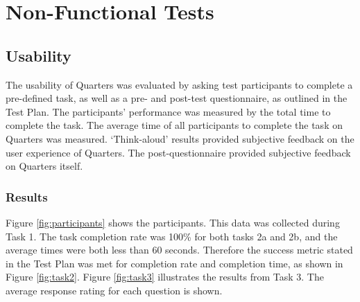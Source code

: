 \documentclass[12pt]{article}
\begin{document}
\section{Non-Functional Tests}

\subsection{Usability}
The usability of Quarters was evaluated by asking test participants to complete a pre-defined task, as well as a pre- and post-test questionnaire, as outlined in the Test Plan. The participants' performance was measured by the total time to complete the task. The average time of all participants to complete the task on Quarters was measured. ‘Think-aloud’ results provided subjective feedback on the user experience of Quarters. The post-questionnaire provided subjective feedback on Quarters itself.

\subsubsection{Results}
Figure \ref{fig:participants} shows the participants. This data was collected during Task 1. The task completion rate was 100\% for both tasks 2a and 2b, and the average times were both less than 60 seconds. Therefore the success metric stated in the Test Plan was met for completion rate and completion time, as shown in Figure \ref{fig:task2}. Figure \ref{fig:task3} illustrates the results from Task 3. The average response rating for each question is shown.
\end{document}
